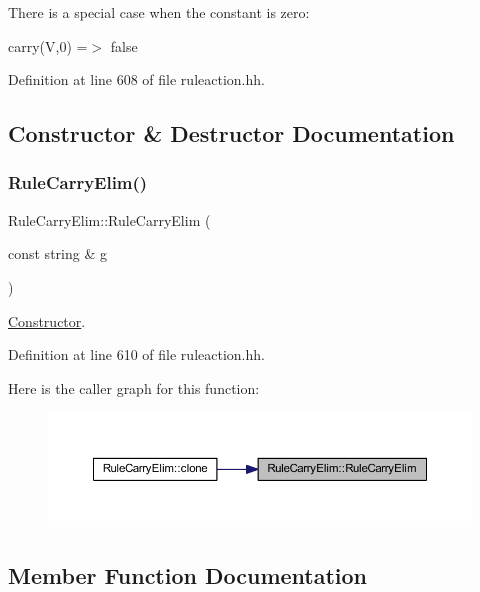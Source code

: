 There is a special case when the constant is zero\+:
\begin{DoxyItemize}
\item {\ttfamily carry(\+V,0) =$>$ false} 
\end{DoxyItemize}

Definition at line 608 of file ruleaction.\+hh.



\subsection{Constructor \& Destructor Documentation}
\mbox{\label{class_rule_carry_elim_ad0e7acbbcdcb6448efa67b6b8ff804e1}} 
\subsubsection{\texorpdfstring{RuleCarryElim()}{RuleCarryElim()}}
{\footnotesize\ttfamily Rule\+Carry\+Elim\+::\+Rule\+Carry\+Elim (\begin{DoxyParamCaption}\item[{const string \&}]{g }\end{DoxyParamCaption})\hspace{0.3cm}{\ttfamily [inline]}}



\mbox{\hyperlink{class_constructor}{Constructor}}. 



Definition at line 610 of file ruleaction.\+hh.

Here is the caller graph for this function\+:
\nopagebreak
\begin{figure}[H]
\begin{center}
\leavevmode
\includegraphics[width=350pt]{class_rule_carry_elim_ad0e7acbbcdcb6448efa67b6b8ff804e1_icgraph}
\end{center}
\end{figure}


\subsection{Member Function Documentation}
\mbox{\label{class_rule_carry_elim_ab7a660e29b328d6348a1cacace3d9844}} 
